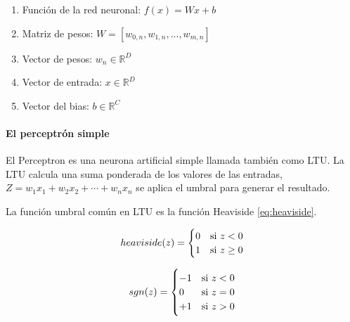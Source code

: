 \begin{enumerate}
    \item Función de la red neuronal: ${f(x) = W x + b}$
    \item Matriz de pesos: ${W = \left[w_{0,n}, w_{1,n}, ...,w_{m,n}\right]}$
    \item Vector de pesos: ${w_{n} \in \mathbb{R}^{D}}$
    \item Vector de entrada: ${x \in \mathbb{R}^{D}}$
    \item Vector del bias: ${b \in \mathbb{R}^{C}}$
\end{enumerate}


\paragraph*{El perceptrón simple}

El Perceptron es una neurona artificial simple llamada también como \gls{LTU}. La \gls{LTU} calcula una suma ponderada de los valores de las entradas, ${Z = w_{1} x_{1} + w_{2} x_{2} + \cdots + w_{n} x_{n}}$ se aplica el umbral para generar el resultado.

La función umbral común en \gls{LTU} es la función Heaviside \ref{eq:heaviside}.

\noindent\begin{minipage}{0.45\textwidth}
    \begin{equation*}
        heaviside(z) =
        \begin{cases}
            0 & \textup{si } z < 0       \\
            1 & \textup{si } z \geq{}  0
        \end{cases}
    \end{equation*}
\end{minipage}
\begin{minipage}{0.45\textwidth}
    \begin{equation}
        sgn(z) =
        \begin{cases}
            -1 & \textup{si } z < 0  \\
            0  & \textup{si } z = 0  \\
            +1 & \textup{si } z >  0
        \end{cases}
        \label{eq:heaviside}
    \end{equation}
\end{minipage}

